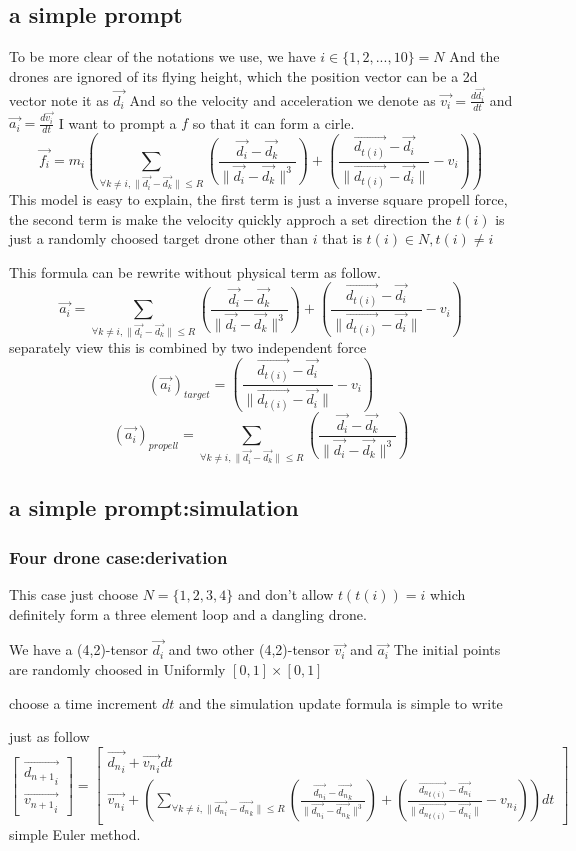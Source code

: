 \documentclass{article}
\theoremstyle{definition} %
\begin{document}
\subsection{a simple prompt}
To be more clear of the notations we use,
we have \(i\in\{1,2,...,10\}=N\)
And the drones are ignored of its flying
height, which the position vector can be a
2d vector note it as \(\vec{d_i}\)
And so the velocity and acceleration we denote as
\(\vec{v_i}=\frac{d\vec{d_i}}{dt}\)
and
\(\vec{a_i}=\frac{d\vec{v_i}}{dt}\)
I want to prompt a \(f\) so that it can form
a cirle.
\[
    \vec{f_i}=m_i(\sum_{\forall k\neq i,\|\vec{d_i}-\vec{d_k}\|\leq R}(\frac{\vec{d_i}-\vec{d_k}}{\|\vec{d_i}-\vec{d_k}\|^3})+(\frac{\vec{d_{t(i)}}-\vec{d_i}}{\|\vec{d_{t(i)}}-\vec{d_i}\|}-v_i))
\]
This model is easy to explain, the first term is
just a inverse square propell force, the second
term is make the velocity quickly approch a set direction
the \(t(i)\) is just a randomly choosed target drone
other than \(i\) that is \(t(i)\in N, t(i)\neq i\)

This formula can be rewrite without physical term as
follow.
\[
    \vec{a_i}=\sum_{\forall k\neq i,\|\vec{d_i}-\vec{d_k}\|\leq R}(\frac{\vec{d_i}-\vec{d_k}}{\|\vec{d_i}-\vec{d_k}\|^3})+(\frac{\vec{d_{t(i)}}-\vec{d_i}}{\|\vec{d_{t(i)}}-\vec{d_i}\|}-v_i)
\]
separately view this is combined by two independent force
\[
    (\vec{a_i})_{target}=(\frac{\vec{d_{t(i)}}-\vec{d_i}}{\|\vec{d_{t(i)}}-\vec{d_i}\|}-v_i)
\]
\[
    (\vec{a_i})_{propell}=\sum_{\forall k\neq i,\|\vec{d_i}-\vec{d_k}\|\leq R}(\frac{\vec{d_i}-\vec{d_k}}{\|\vec{d_i}-\vec{d_k}\|^3})
\]

\subsection{a simple prompt:simulation}
\subsubsection{Four drone case:derivation}
This case just choose \(N=\{1,2,3,4\}\)
and don't allow \(t(t(i))=i\)
which definitely form a three element loop and
a dangling drone.

We have a (4,2)-tensor \(\vec{d_i}\)
and two other (4,2)-tensor \(\vec{v_i}\)
and \(\vec{a_i}\)
The initial points are randomly choosed
in Uniformly \([0,1]\times[0,1]\)

choose a time increment \(dt\)
and the simulation update formula is simple to write

just as follow
\[\begin{bmatrix}
        \vec{{d_{n+1}}_i} \\
        \vec{{v_{n+1}}_i}
    \end{bmatrix}=
    \begin{bmatrix}
        \vec{{d_{n}}_i}+\vec{{v_n}_i}dt \\
        \vec{{v_{n}}_i}+(\sum_{\forall k\neq i,\|\vec{{d_n}_i}-\vec{{d_n}_k}\|\leq R}(\frac{\vec{{d_n}_i}-\vec{{d_n}_k}}{\|\vec{{d_n}_i}-\vec{{d_n}_k}\|^3})+(\frac{\vec{{d_n}_{t(i)}}-\vec{{d_n}_i}}{\|\vec{{d_n}_{t(i)}}-\vec{{d_n}_i}\|}-{v_n}_i))dt
    \end{bmatrix}
\]
simple Euler method.
\end{document}

